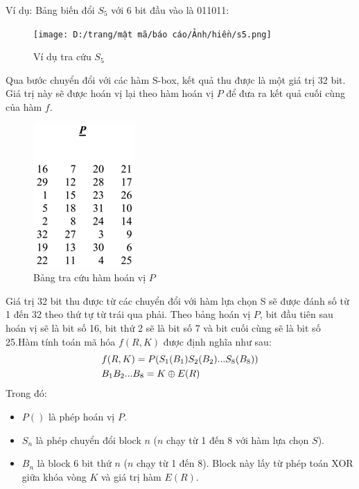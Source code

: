 Ví dụ: Bảng biến đổi $S_{5}$ với 6 bit đầu vào là 011011:
\begin{figure}[H]
    \centering
    \texttt{[image: D:/trang/mật mã/báo cáo/Ảnh/hiền/s5.png]}
    \caption{Ví dụ tra cứu $S_5$}
\end{figure}
Qua bước chuyển đổi với các hàm S-box, kết quả thu được là một giá trị 32 bit. Giá trị này sẽ được hoán vị lại theo hàm hoán vị $P$ để đưa ra kết quả cuối cùng của hàm $f$.
\begin{figure}[H]
	\includegraphics[scale=0.6]{"Ảnh/hiền/hoán vị P"}
	\caption{Bảng tra cứu hàm hoán vị $P$}
	\label{fig:hoan-vi-p}
\end{figure}
Giá trị 32 bit thu được từ các chuyển đổi với hàm lựa chọn S sẽ được đánh số từ 1 đến 32 theo thứ tự từ trái qua phải. Theo bảng hoán vị $P$, bit đầu tiên sau hoán vị sẽ là bit số 16, bit thứ 2 sẽ là bit số 7 và bit cuối cùng sẽ là bit số 25.Hàm tính toán mã hóa $f(R, K)$ được định nghĩa như sau:
\[\begin{gathered}
  f(R,K) = P({S_1}({B_1}){S_2}({B_2})...{S_8}({B_8})) \hfill \\
  {B_1}{B_2}...{B_8} = K \oplus E(R) \hfill \\ 
\end{gathered} \]
Trong đó: 
\begin{itemize}
    \item $P()$ là phép hoán vị $P$.
    \item $S_{n}$ là phép chuyển đổi block $n$ ($n$ chạy từ 1 đến 8 với hàm lựa chọn $S$).
    \item $B_{n}$ là block 6 bit thứ $n$ ($n$ chạy từ 1 đến 8). Block này lấy từ phép toán XOR giữa khóa vòng $K$ và giá trị hàm $E(R)$.
\end{itemize}
